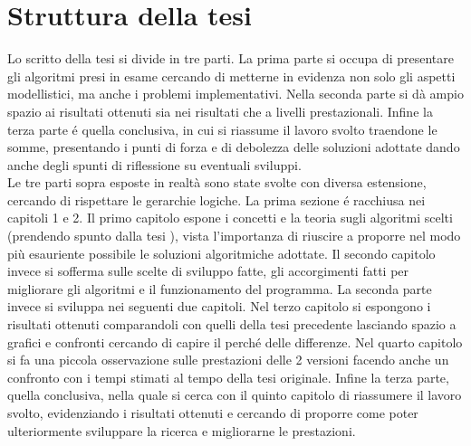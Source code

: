 \section{Struttura della tesi}
Lo scritto della tesi si divide in tre parti.
La prima parte si occupa di presentare gli algoritmi presi in esame cercando di metterne in evidenza
non solo gli aspetti modellistici, ma anche i problemi implementativi.
Nella seconda parte si d\`a ampio spazio ai risultati ottenuti sia nei risultati che a livelli
prestazionali.
Infine la terza parte \'e quella conclusiva, in cui si riassume il lavoro svolto traendone
le somme, presentando i punti di forza e di debolezza delle soluzioni
adottate dando anche degli spunti di riflessione su eventuali sviluppi.\\

Le tre parti sopra esposte in realt\`a sono state svolte con diversa estensione,
cercando di rispettare le gerarchie logiche.
La prima sezione \'e racchiusa nei capitoli 1 e 2.
Il primo capitolo espone i concetti e la teoria sugli algoritmi scelti (prendendo spunto
dalla tesi \cite{cit_50}), vista l'importanza di riuscire a proporre nel
modo pi\`u esauriente possibile le soluzioni algoritmiche adottate. Il secondo
capitolo invece si sofferma sulle scelte di sviluppo fatte, gli accorgimenti
fatti per migliorare gli algoritmi e il funzionamento del programma.
La seconda parte invece si sviluppa nei seguenti due capitoli.
Nel terzo capitolo si espongono i risultati ottenuti comparandoli con quelli
della tesi precedente lasciando spazio a grafici e confronti cercando
di capire il perch\'e delle differenze.
Nel quarto capitolo si fa una piccola osservazione sulle prestazioni delle 2 versioni
facendo anche un confronto con i tempi stimati al tempo della tesi originale.
Infine la terza parte, quella conclusiva, nella quale si cerca con il quinto capitolo
di riassumere il lavoro svolto, evidenziando i risultati ottenuti e cercando
di proporre come poter ulteriormente sviluppare la ricerca e migliorarne le prestazioni.
